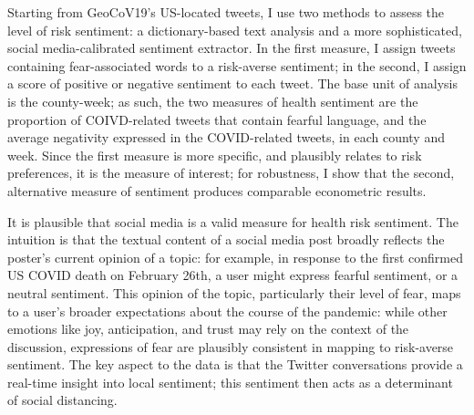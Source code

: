 \documentclass[12pt,a4]{article}
\begin{document}
Starting from GeoCoV19's US-located tweets, I use two methods to assess the level of risk sentiment: a dictionary-based text analysis and a more sophisticated, social media-calibrated sentiment extractor. In the first measure, I assign tweets containing fear-associated words to a risk-averse sentiment; in the second, I assign a score of positive or negative sentiment to each tweet. The base unit of analysis is the county-week; as such, the two measures of health sentiment are the proportion of COIVD-related tweets that contain fearful language, and the average negativity expressed in the COVID-related tweets, in each county and week. Since the first measure is more specific, and plausibly relates to risk preferences, it is the measure of interest; for robustness, I show that the second, alternative measure of sentiment produces comparable econometric results.

It is plausible that social media is a valid measure for health risk sentiment. The intuition is that the textual content of a social media post broadly reflects the poster's current opinion of a topic: for example, in response to the first confirmed US COVID death on February 26th, a user might express fearful sentiment, or a neutral sentiment. This opinion of the topic, particularly their level of fear, maps to a user's broader expectations about the course of the pandemic: while other emotions like joy, anticipation, and trust may rely on the context of the discussion, expressions of fear are plausibly consistent in mapping to risk-averse sentiment. The key aspect to the data is that the Twitter conversations provide a real-time insight into local sentiment; this sentiment then acts as a determinant of social distancing.

\end{document}
